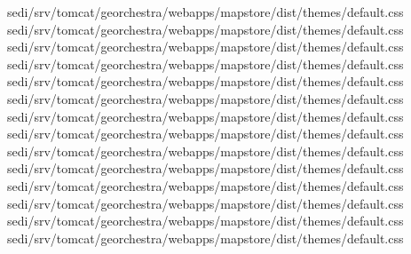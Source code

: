 \documentclass[letterpaper,10pt,french]{sphinxmanual}
\begin{document}
\begin{sphinxVerbatim}[commandchars=\\\{\}]
sed\PYGZhy{}i/srv/tomcat/georchestra/webapps/mapstore/dist/themes/default.css
sed\PYGZhy{}i/srv/tomcat/georchestra/webapps/mapstore/dist/themes/default.css
sed\PYGZhy{}i/srv/tomcat/georchestra/webapps/mapstore/dist/themes/default.css
sed\PYGZhy{}i/srv/tomcat/georchestra/webapps/mapstore/dist/themes/default.css
sed\PYGZhy{}i/srv/tomcat/georchestra/webapps/mapstore/dist/themes/default.css
sed\PYGZhy{}i/srv/tomcat/georchestra/webapps/mapstore/dist/themes/default.css
sed\PYGZhy{}i/srv/tomcat/georchestra/webapps/mapstore/dist/themes/default.css
sed\PYGZhy{}i/srv/tomcat/georchestra/webapps/mapstore/dist/themes/default.css
sed\PYGZhy{}i/srv/tomcat/georchestra/webapps/mapstore/dist/themes/default.css
sed\PYGZhy{}i/srv/tomcat/georchestra/webapps/mapstore/dist/themes/default.css
sed\PYGZhy{}i/srv/tomcat/georchestra/webapps/mapstore/dist/themes/default.css
sed\PYGZhy{}i/srv/tomcat/georchestra/webapps/mapstore/dist/themes/default.css
sed\PYGZhy{}i/srv/tomcat/georchestra/webapps/mapstore/dist/themes/default.css
sed\PYGZhy{}i/srv/tomcat/georchestra/webapps/mapstore/dist/themes/default.css

\end{sphinxVerbatim}
\end{document}
